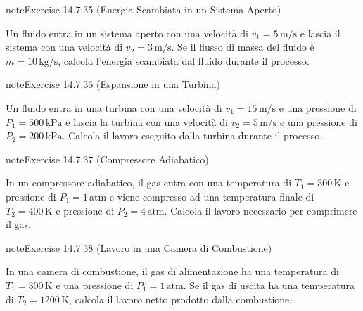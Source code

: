 \documentclass[letterpaper,10pt,italian]{jupyterBook}
\begin{document}
\begin{sphinxadmonition}{note}{Exercise 14.7.35 (Energia Scambiata in un Sistema Aperto)}



\sphinxAtStartPar
Un fluido entra in un sistema aperto con una velocità di \(v_1 = 5 \, \text{m/s}\) e lascia il sistema con una velocità di \(v_2 = 3 \, \text{m/s}\). Se il flusso di massa del fluido è \(m = 10 \, \text{kg/s}\), calcola l’energia scambiata dal fluido durante il processo.
\end{sphinxadmonition}
 \label{exercise:ch/thermodynamics/principles-problems-exercise-35}

\begin{sphinxadmonition}{note}{Exercise 14.7.36 (Espansione in una Turbina)}



\sphinxAtStartPar
Un fluido entra in una turbina con una velocità di \(v_1 = 15 \, \text{m/s}\) e una pressione di \(P_1 = 500 \, \text{kPa}\) e lascia la turbina con una velocità di \(v_2 = 5 \, \text{m/s}\) e una pressione di \(P_2 = 200 \, \text{kPa}\). Calcola il lavoro eseguito dalla turbina durante il processo.
\end{sphinxadmonition}
 \label{exercise:ch/thermodynamics/principles-problems-exercise-36}

\begin{sphinxadmonition}{note}{Exercise 14.7.37 (Compressore Adiabatico)}



\sphinxAtStartPar
In un compressore adiabatico, il gas entra con una temperatura di \(T_1 = 300 \, \text{K}\) e pressione di \(P_1 = 1 \, \text{atm}\) e viene compresso ad una temperatura finale di \(T_2 = 400 \, \text{K}\) e pressione di \(P_2 = 4 \, \text{atm}\). Calcola il lavoro necessario per comprimere il gas.
\end{sphinxadmonition}
 \label{exercise:ch/thermodynamics/principles-problems-exercise-37}

\begin{sphinxadmonition}{note}{Exercise 14.7.38 (Lavoro in una Camera di Combustione)}



\sphinxAtStartPar
In una camera di combustione, il gas di alimentazione ha una temperatura di \(T_1 = 300 \, \text{K}\) e una pressione di \(P_1 = 1 \, \text{atm}\). Se il gas di uscita ha una temperatura di \(T_2 = 1200 \, \text{K}\), calcola il lavoro netto prodotto dalla combustione.
\end{sphinxadmonition}
 \label{exercise:ch/thermodynamics/principles-problems-exercise-38}
\end{document}
